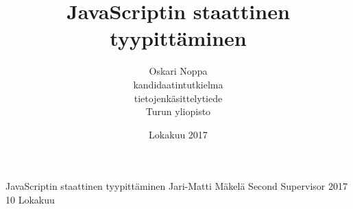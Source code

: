 \documentclass[a4paper, 12pt]{report}
\title{JavaScriptin staattinen tyypittäminen}
\author{Oskari Noppa \\kandidaatintutkielma \\ tietojenkäsittelytiede \\ Turun yliopisto}
\date{Lokakuu 2017}
\begin{document}
  \fintrue

  \iffin
  \renewcommand{\appname}{Liitteet}
  \else
  \renewcommand{\appname}{Appendices}
  \fi
  
  {JavaScriptin staattinen tyypittäminen}
  {Jari-Matti Mäkelä}
  {Second Supervisor}
  {2017}
  {10}
  {Lokakuu}
  
  
  \gentitle
  
  \pagestyle{empty}
  
  
  \tableofcontents
  \clearpage
  
  
\end{document}
